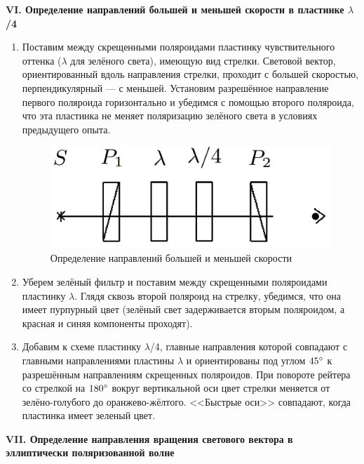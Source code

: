 \documentclass[a4paper,12pt]{article} %
\begin{document}
	\begin{center}
		\textbf{VI. Определение направлений большей и меньшей скорости в пластинке $\lambda$/4}
	\end{center}

	\begin{enumerate}
		\item Поставим между скрещенными поляроидами пластинку чувствительного оттенка ($\lambda$ для зелёного света), имеющую вид стрелки. Световой вектор, ориентированный вдоль направления стрелки, проходит с большей скоростью, перпендикулярный — с меньшей. Установим разрешённое направление первого поляроида горизонтально и убедимся с помощью второго поляроида, что эта пластинка не меняет поляризацию зелёного света в условиях предыдущего опыта.
		
		\begin{figure}[h!]
			\centering
			\includegraphics[scale=0.5]{Pictures/VI}
			\caption{Определение направлений большей и меньшей скорости}
		\end{figure}
		
		\item Уберем зелёный фильтр и поставим между скрещенными поляроидами пластинку $\lambda$. Глядя сквозь второй поляроид на стрелку, убедимся, что она имеет пурпурный цвет (зелёный свет задерживается вторым поляроидом, а красная и синяя компоненты проходят).
		
		\item Добавим к схеме пластинку $\lambda$/4, главные направления которой совпадают с главными направлениями пластины $\lambda$ и ориентированы под углом $45\degree$ к разрешённым направлениям скрещенных поляроидов. При повороте рейтера со стрелкой на $180\degree$ вокруг вертикальной оси цвет стрелки меняется от зелёно-голубого до оранжево-жёлтого. <<Быстрые оси>> совпадают, когда пластинка имеет зеленый цвет.
	\end{enumerate}

	
	\begin{center}
		\textbf{VII. Определение направления вращения светового вектора в эллиптически поляризованной волне}
	\end{center}
\end{document}
